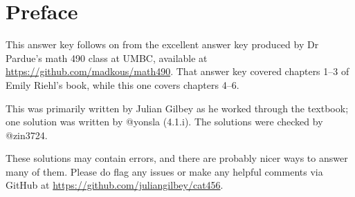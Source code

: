 \documentclass[main]{subfiles}
\begin{document}
\chapter*{Preface}

This answer key follows on from the excellent answer key produced by
Dr Pardue's math 490 class at UMBC, available at
\url{https://github.com/madkous/math490}.  That answer key covered
chapters 1--3 of Emily Riehl's book, while this one covers chapters
4--6.

This was primarily written by Julian Gilbey as he worked through the
textbook; one solution was written by @yonsla (4.1.i).  The solutions
were checked by @zin3724.

These solutions may contain errors, and there are probably nicer ways
to answer many of them.  Please do flag any issues or make any helpful
comments via GitHub at \url{https://github.com/juliangilbey/cat456}.
\end{document}
